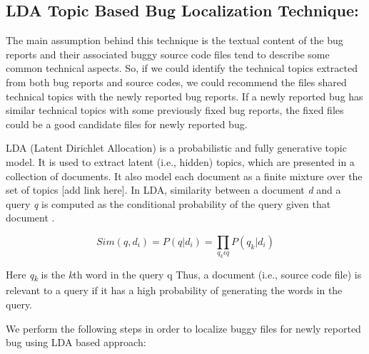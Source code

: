 \documentclass{sig-alternate}
\begin{document}
\subsection{LDA Topic Based Bug Localization Technique:}
The main assumption behind this technique is the textual content of the bug reports and their associated buggy source code files tend to describe some common technical aspects. So, if  we could identify the technical topics extracted from both bug reports and source codes, we could recommend the files shared technical topics with the newly reported bug reports. If a newly reported bug has similar technical topics with some previously fixed bug reports, the fixed files could be a good candidate files for newly reported bug.

LDA (Latent Dirichlet Allocation) is a probabilistic and fully generative topic model. It is used to extract latent (i.e., hidden) topics, which are presented in a collection of documents. It also model each document as a finite mixture over the set of topics [add link here]. In LDA, similarity between a document \textit{d} and a query \textit{q} is computed as the conditional probability of the query given that document \cite{Lukins2}.

\begin{equation}
Sim(q,d_{i})=P(q|d_{i})=\prod_{q_{k}\epsilon q}P(q_{k}|d_{i})
\end{equation}

Here \textit{q\textsubscript{k}} is the \textit{k}th word in the query {q} Thus, a document (i.e., source code file) is relevant to a query if it has a high probability of generating the words in the query.

We perform the following steps in order to localize buggy files for newly reported bug using LDA based approach:
\end{document}
